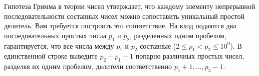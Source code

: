 Гипотеза Гримма в теории чисел утверждает, что
каждому элементу непрерывной последовательности составных чисел
можно сопоставить уникальный простой делитель. Вам требуется
построить это соответствие.
\InputFile
На вход подаются два последовательных простых числа $p_1$ и $p_2$,
разделенных одним пробелом, гарантируется, что все числа между $p_1$
и $p_2$ составные ($2 \le p_1 < p_2 \le 10^9$).
\OutputFile
В единственной строке выведите $p_2 - p_1 - 1$ попарно различных
простых чисел, разделяя их одним пробелом, делители соответственно
$p_1 + 1, \ldots, p_2 - 1$.
